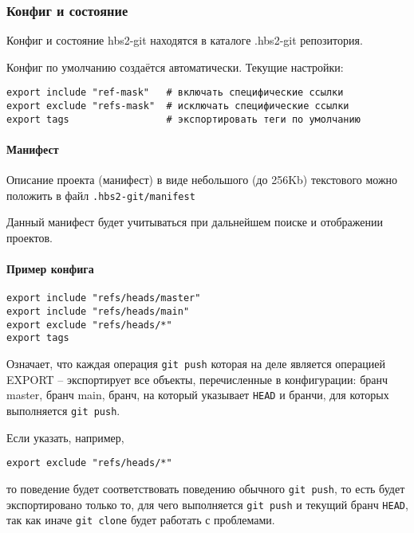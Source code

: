 \documentclass[11pt,a4paper]{article}
\begin{document}
\subsubsection{Конфиг и состояние}

Конфиг и состояние hbs2-git находятся в каталоге .hbs2-git репозитория.

Конфиг по умолчанию создаётся автоматически. Текущие настройки:

\begin{verbatim}
export include "ref-mask"   # включать специфические ссылки
export exclude "refs-mask"  # исключать специфические ссылки
export tags                 # экспортировать теги по умолчанию
\end{verbatim}

\paragraph{Манифест}

Описание проекта (манифест) в виде небольшого (до 256Kb)
текстового можно положить в файл \texttt{.hbs2-git/manifest}

Данный манифест будет учитываться при дальнейшем поиске и отображении проектов.

\paragraph{Пример конфига}

\begin{verbatim}
export include "refs/heads/master"
export include "refs/heads/main"
export exclude "refs/heads/*"
export tags
\end{verbatim}

Означает, что каждая операция \texttt{git push} которая на деле является операцией EXPORT --
экспортирует все объекты, перечисленные в конфигурации: бранч master, бранч main, бранч, на который
указывает \texttt{HEAD} и бранчи, для которых выполняется \texttt{git push}.

Если указать, например,

\begin{verbatim}
export exclude "refs/heads/*"
\end{verbatim}

то поведение будет соответствовать поведению обычного \texttt{git push}, то есть будет
экспортировано только то, для чего выполняется \texttt{git push} и текущий бранч \texttt{HEAD}, так
как иначе \texttt{git clone} будет работать с проблемами.
\end{document}
